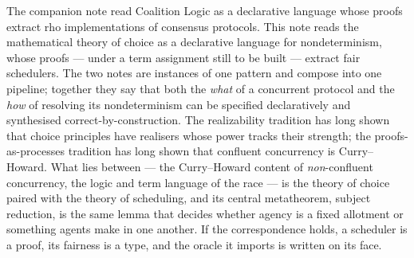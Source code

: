 \documentclass[11pt]{article}
\theoremstyle{definition}
\theoremstyle{plain}
\theoremstyle{remark}
\begin{document}
The companion note \cite{consensus} read Coalition Logic as a declarative language whose proofs extract rho
implementations of consensus protocols. This note reads the mathematical theory of choice as a declarative language
for nondeterminism, whose proofs --- under a term assignment still to be built --- extract fair schedulers. The two
notes are instances of one pattern and compose into one pipeline; together they say that both the \emph{what} of a
concurrent protocol and the \emph{how} of resolving its nondeterminism can be specified declaratively and synthesised
correct-by-construction. The realizability tradition has long shown that choice principles have realisers whose power
tracks their strength; the proofs-as-processes tradition has long shown that confluent concurrency is Curry--Howard.
What lies between --- the Curry--Howard content of \emph{non}-confluent concurrency, the logic and term language of the
race --- is the theory of choice paired with the theory of scheduling, and its central metatheorem, subject reduction,
is the same lemma that decides whether agency is a fixed allotment or something agents make in one another. If the
correspondence holds, a scheduler is a proof, its fairness is a type, and the oracle it imports is written on its face.
\end{document}
